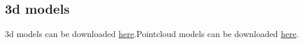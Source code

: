 \subsection{3d models} 
3d models can be downloaded \href{https://data.hasdata.xyz/}{here}.Pointcloud models can be downloaded \href{https://data.hasdata.xyz/}{here}.